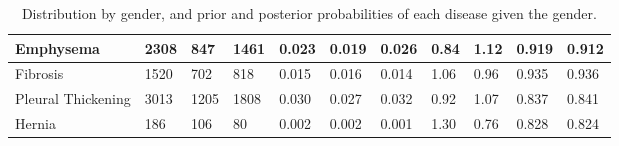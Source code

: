 \documentclass[12pt,oneside,a4paper]{report}
\begin{document}
\begin{landscape}
\begin{table}
\begin{tabular}{@{}lllllllllll@{}}
Emphysema          & 2308             & 847    & 1461  & 0.023             & 0.019                 & 0.026 & 0.84              & 1.12 & 0.919  & 0.912 \\ \midrule
Fibrosis           & 1520             & 702    & 818   & 0.015             & 0.016                 & 0.014 & 1.06              & 0.96 & 0.935  & 0.936 \\ \midrule
Pleural Thickening & 3013             & 1205   & 1808  & 0.030             & 0.027                 & 0.032 & 0.92              & 1.07 & 0.837  & 0.841 \\ \midrule
Hernia             & 186              & 106    & 80    & 0.002             & 0.002                 & 0.001 & 1.30              & 0.76 & 0.828  & 0.824 \\
\bottomrule
\end{tabular}\
\caption{Distribution by gender, and prior and posterior probabilities of each disease given the gender.}
\label{tab:gender_bias}
\end{table}
\end{landscape}
\end{document}
